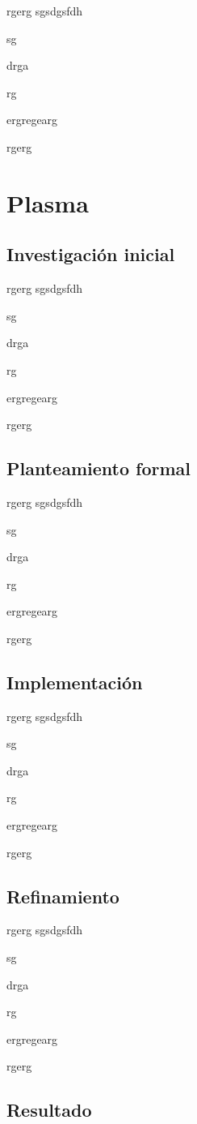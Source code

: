 rgerg
sgsdgsfdh

sg

drga

rg

ergregearg

rgerg

\section{Plasma}

\subsection{Investigación inicial}

rgerg
sgsdgsfdh

sg

drga

rg

ergregearg

rgerg

\subsection{Planteamiento formal}

rgerg
sgsdgsfdh

sg

drga

rg

ergregearg

rgerg

\subsection{Implementación}

rgerg
sgsdgsfdh

sg

drga

rg

ergregearg

rgerg

\subsection{Refinamiento}

rgerg
sgsdgsfdh

sg

drga

rg

ergregearg

rgerg

\subsection{Resultado}

